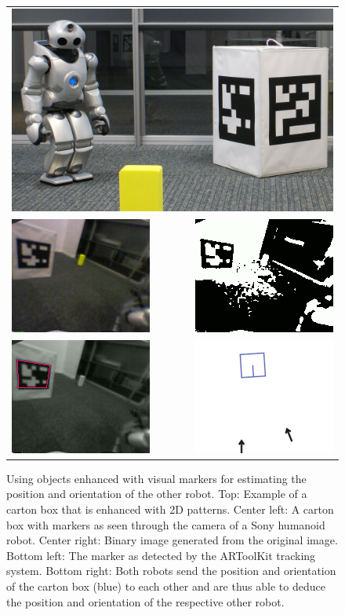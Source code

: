 \begin{figure}[t]
  \begin{tabular}{lr}
    \multicolumn{2}{l}{
      \includegraphics[width=0.6\columnwidth]{figures/artoolkit-0}\vspace{4mm}} \\
    \includegraphics[width=0.28\columnwidth]{figures/artoolkit-1} & 
    \includegraphics[width=0.28\columnwidth]{figures/artoolkit-2}\vspace{4mm}\\
    \includegraphics[width=0.28\columnwidth]{figures/artoolkit-3} & 
    \includegraphics[width=0.28\columnwidth]{figures/artoolkit-4}\\
  \end{tabular}
  \caption{Using objects enhanced with visual markers for estimating
    the position and orientation of the other robot. Top: Example of a
    carton box that is enhanced with 2D patterns. Center left: A
    carton box with markers as seen through the camera of a Sony
    humanoid robot. Center right: Binary image generated from the
    original image.  Bottom left: The marker as detected by the
    ARToolKit tracking system. Bottom right: Both robots send the
    position and orientation of the carton box (blue) to each other
    and are thus able to deduce the position and orientation of the
    respective other robot. }
  \label{f:artoolkit}
\end{figure}

